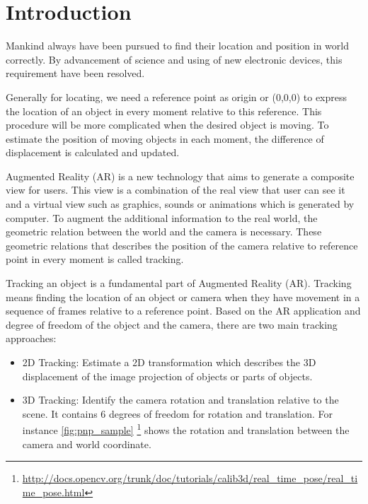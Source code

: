 \chapter{Introduction}\label{chapter:introduction}
Mankind always have been pursued to find their location and position in world correctly. By advancement of science and using of new electronic devices, this requirement have been resolved. 

Generally for locating, we need a reference point as origin or (0,0,0) to express the location of an object in every moment relative to this reference. This procedure will be more complicated when the desired object is moving. To estimate the position of moving objects in each moment, the difference of displacement is calculated and updated.

Augmented Reality (AR) is a new technology that aims to generate a composite view for users. This view is a combination of the real view that user can see it and a virtual view such as graphics, sounds or animations which is generated by computer. To augment the additional information to the real world, the geometric relation between the world and the camera is necessary. These geometric relations that describes the position of the camera relative to reference point in every moment is called tracking.

Tracking an object is a fundamental part of Augmented Reality (AR). Tracking means finding the location of an object or camera when they have movement in a sequence of frames relative to a reference point. Based on the AR application and degree of freedom of the object and the camera, there are two main tracking approaches:

\begin{itemize}
\item 2D Tracking: Estimate a 2D transformation which describes the 3D displacement of the image projection of objects or parts of objects.
\item 3D Tracking: Identify the camera rotation and translation relative to the scene. It contains 6 degrees of freedom for rotation and translation. For instance \autoref{fig:pnp_sample} \footnote{\url{http://docs.opencv.org/trunk/doc/tutorials/calib3d/real_time_pose/real_time_pose.html}} shows the rotation and translation between the camera and world coordinate. 
\end{itemize}

